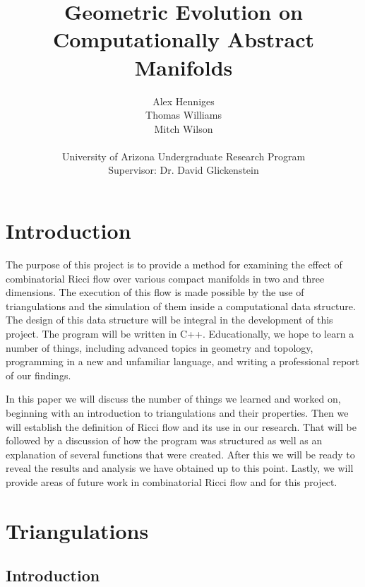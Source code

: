 \documentclass[12pt]{article}
\title{Geometric Evolution on Computationally Abstract Manifolds}
\author{Alex Henniges \\ Thomas Williams \\ Mitch Wilson \\ \\ University of Arizona Undergraduate Research Program\\
Supervisor: Dr. David Glickenstein\\
}
\begin{document}
\maketitle
\thispagestyle{empty}
\newpage
\renewcommand\contentsname{Table of Contents}
\tableofcontents

\newpage
\section{Introduction}
\maketitle

The purpose of this project is to provide a method for examining the effect of combinatorial Ricci flow over various compact manifolds in two and three dimensions. The execution of this flow is made possible by the use of triangulations and the simulation of them inside a computational data structure. The design of this data structure will be integral in the development of this project. The program will be written in C++. Educationally, we hope to learn a number of things, including advanced topics in geometry and topology, programming in a new and unfamiliar language, and writing a professional report of our findings. \newline

\noindent In this paper we will discuss the number of things we learned and worked on, beginning with an introduction to triangulations and their properties. Then we will establish the definition of Ricci flow and its use in our research. That will be followed by a discussion of how the program was structured as well as an explanation of several functions that were created. After this we will be ready to reveal the results and analysis we have obtained up to this point. Lastly, we will provide areas of future work in combinatorial Ricci flow and for this project.

\section{Triangulations}
\maketitle
\subsection{Introduction}
\maketitle
\end{document}
